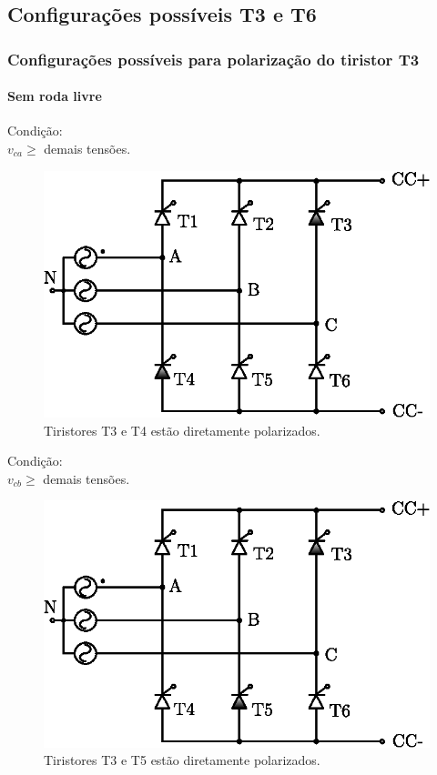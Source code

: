 \documentclass[aspectratio=43]{beamer}
\begin{document}
\subsection{Configurações possíveis T3 e T6}
\begin{frame}
	\frametitle{Configurações possíveis para polarização do tiristor T3}
	\framesubtitle{Sem roda livre}
	
	\begin{minipage}{0.5\textwidth}\centering
		Condição:\\ $v_{ca} \ge $ demais tensões.
		\begin{figure}
			\centering
			\includegraphics[width=0.9\linewidth]{figuras/GraetzTiristorT3T4}
			\caption{Tiristores T3 e T4 estão diretamente polarizados.}
		\end{figure}	
	\end{minipage}%
	\begin{minipage}{0.5\textwidth}\centering
		Condição:\\ $v_{cb} \ge $ demais tensões.
		\begin{figure}
			\centering
			\includegraphics[width=0.9\linewidth]{figuras/GraetzTiristorT3T5}
			\caption{Tiristores T3 e T5 estão diretamente polarizados.}
		\end{figure}		
	\end{minipage}	
\end{frame}
\end{document}
